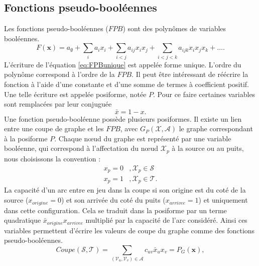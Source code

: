 \documentclass[../main/These_Mathias_Paget.tex]{subfiles}
\begin{document}
\subsection{Fonctions pseudo-booléennes}
	\label{ss:FPB_graph}
Les fonctions pseudo-booléennes ($FPB$) sont des polynômes de variables booléennes.
	\begin{equation}
		F(\boldsymbol{x}) = a_{ \emptyset} +  \sum_{i}{a_ix_i} + \sum_{i<j}{a_{ij}x_ix_j} + \sum_{i<j<k}{a_{ijk}x_ix_jx_k} + \ldots.
		\label{eq:FPBunique}
	\end{equation}
L'écriture de l'équation \ref{eq:FPBunique} est appelée forme unique. L'ordre du polynôme correspond à l'ordre de la $FPB$. Il peut être intéressant de réécrire la fonction à l'aide d'une constante et d'une somme de termes à coefficient positif. Une telle écriture est appelée posiforme, notée $P$. Pour ce faire certaines variables sont remplacées par leur conjuguée
	\begin{equation}
		\bar{x} = 1 - x.
	\end{equation}
Une fonction pseudo-booléenne possède plusieurs posiformes. Il existe un lien entre une coupe de graphe et les $FPB$, avec $G_{P}(\boldsymbol{\mathcal{X}},\boldsymbol{\mathcal{A}})$ le graphe correspondant à la posiforme $P$. Chaque nœud du graphe est représenté par une variable booléenne, qui correspond à l'affectation du nœud $\mathcal{X}_p$ à la source ou au puits, nous choisissons la convention :
	\begin{equation}
		\begin{aligned}
				x_p = 0 &, \mathcal{X}_p \in \boldsymbol{\mathcal{S}} \\
				x_p = 1 &, \mathcal{X}_p \in \boldsymbol{\mathcal{T}}.
		\end{aligned}
	\end{equation}
La capacité d'un arc entre en jeu dans la coupe si son origine est du coté de la source ($x_{origine}=0$) et son arrivée du coté du puits ($x_{arrivee}=1$) et uniquement dans cette configuration. Cela se traduit dans la posiforme par un terme quadratique $\bar{x}_{origine}x_{arrivee}$ multiplié par la capacité de l'arc considéré. Ainsi ces variables permettent d'écrire les valeurs de coupe du graphe comme des fonctions pseudo-booléennes.
	\begin{equation}
	\label{eq:cut_posi}
		Coupe(\boldsymbol{\mathcal{S}}, \boldsymbol{\mathcal{T}}) = \sum_{(\mathcal{V}_u, \mathcal{V}_v) \in \boldsymbol{\mathcal{A}}}{c_{uv}\bar{x}_ux_v} = P_G(\boldsymbol{x}),
	\end{equation}
\end{document}
